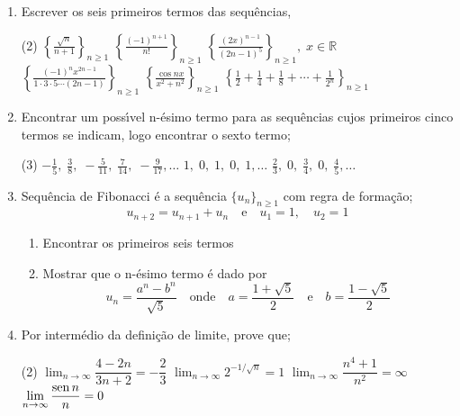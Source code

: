 \begin{enumerate}[label=\rm{(\arabic*)}]
\item Escrever os seis primeiros termos das sequ\^encias,
\begin{tasks}[label=\rm{(\alph*)},item-indent=4em,label-width=4ex,ref=\rm{(\alph*)}](2)
\task \(\left\{\displaystyle{\frac{\sqrt{n}}{n+1}}\right\}_{n\geq 1}\)
\task  \(\left\{\displaystyle{\frac{(-1)^{n+1}}{n!}} \right\}_{n\geq 1}\)
\task \(\left\{\displaystyle{\frac{(2x)^{n-1}}{(2n-1)^5}}\right\}_{n\geq 1},\;  x\in \mathbb{R}\)
\task \(\left\{\displaystyle{\frac{(-1)^{n}x^{2n-1}}{1\cdot 3\cdot 5 \cdots(2n-1)}}\right\} _{n\geq 1}\)
\task \(\left\{\displaystyle{\frac{\cos nx}{x^2+n^2}}\right\}_{n\geq 1}\)
\task \(\left\{\displaystyle{\frac{1}{2}+\frac{1}{4}+\frac{1}{8}+ \cdots+\frac{1}{2^n}}\right\}_{n\geq 1}\)
\end{tasks}

\item Encontrar um poss\'\i vel n-\'esimo termo para as
sequ\^encias cujos primeiros cinco termos se indicam, logo
encontrar o sexto termo;
\begin{tasks}[label=\rm{(\alph*)},item-indent=4em,label-width=4ex,ref=\rm{(\alph*)}](3)
\task \(-\displaystyle{\frac{1}{5}},\; \displaystyle{\frac{3}{8}},\;
-\displaystyle{\frac{5}{11}},\; \displaystyle{\frac{7}{14}},\; -\displaystyle{\frac{9}{17}}, \ldots\)
\task  \(1,\; 0,\; 1,\; 0,\; 1,\ldots \)
\task \(\displaystyle{\frac{2}{3}},\;  0,\; \displaystyle{\frac{3}{4}},\;  0,\; \displaystyle{\frac{4}{5}},\ldots\)
\end{tasks}

\item Sequ\^encia de Fibonacci \'e a sequ\^encia $\{u_n\}_{n\geq 1}$ com
regra de forma\c c\~ao;
\begin{equation*}
u_{n+2}=u_{n+1}+u_{n}\quad \text{e} \quad u_{1}=1,\quad u_{2}=1
\end{equation*}

\begin{enumerate}
  \item Encontrar os primeiros seis termos
  \item Mostrar que o n-\'esimo termo \'e dado por
\begin{equation*}
u_{n}=\frac{a^n-b^n}{\sqrt{5}}\quad \text{onde}\quad
a=\frac{1+\sqrt{5}}{2}\quad\text{e}\quad b=\frac{1-\sqrt{5}}{2}
\end{equation*}

\end{enumerate}
\item Por interm\'{e}dio da defini\c c\~ao de limite, prove que;
\begin{tasks}[label=\rm{(\alph*)},item-indent=4em,label-width=4ex,ref=\rm{(\alph*)}](2)
\task  \(\displaystyle{\lim_{n\to\infty}\dfrac{4-2n}{3n+2}=-\dfrac{2}{3}}\)
\task  \(\displaystyle{\lim_{n\to\infty}2^{-1/\sqrt{n}}=1}\)
\task  \(\displaystyle{\lim_{n\to\infty}\dfrac{n^4+1}{n^2}=\infty}\)
\task  \(\displaystyle{\lim_{n\to\infty}\dfrac{\operatorname{sen}n}{n}=0}\)
\end{tasks}


\end{enumerate}
